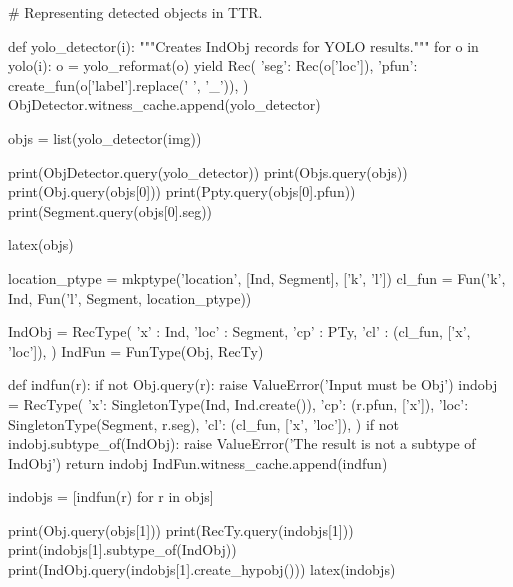 \begin{cell}
# Representing detected objects in TTR.

def yolo_detector(i):
    """Creates IndObj records for YOLO results."""
    for o in yolo(i):
        o = yolo_reformat(o)
        yield Rec({
            'seg': Rec(o['loc']),
            'pfun': create_fun(o['label'].replace(' ', '_')),
        })
ObjDetector.witness_cache.append(yolo_detector)

objs = list(yolo_detector(img))

print(ObjDetector.query(yolo_detector))
print(Objs.query(objs))
print(Obj.query(objs[0]))
print(Ppty.query(objs[0].pfun))
print(Segment.query(objs[0].seg))

latex(objs)
\end{cell}

\begin{cell}
location_ptype = mkptype('location', [Ind, Segment], ['k', 'l'])
cl_fun = Fun('k', Ind, Fun('l', Segment, location_ptype))

IndObj = RecType({
    'x' : Ind,
    'loc' : Segment,
    'cp' : PTy,
    'cl' : (cl_fun, ['x', 'loc']),
})
IndFun = FunType(Obj, RecTy)

def indfun(r):
    if not Obj.query(r):
        raise ValueError('Input must be Obj')
    indobj = RecType({
        'x': SingletonType(Ind, Ind.create()),
        'cp': (r.pfun, ['x']),
        'loc': SingletonType(Segment, r.seg),
        'cl': (cl_fun, ['x', 'loc']),
    })
    if not indobj.subtype_of(IndObj):
        raise ValueError('The result is not a subtype of IndObj')
    return indobj
IndFun.witness_cache.append(indfun)

indobjs = [indfun(r) for r in objs]

print(Obj.query(objs[1]))
print(RecTy.query(indobjs[1]))
print(indobjs[1].subtype_of(IndObj))
print(IndObj.query(indobjs[1].create_hypobj()))
latex(indobjs)
\end{cell}

